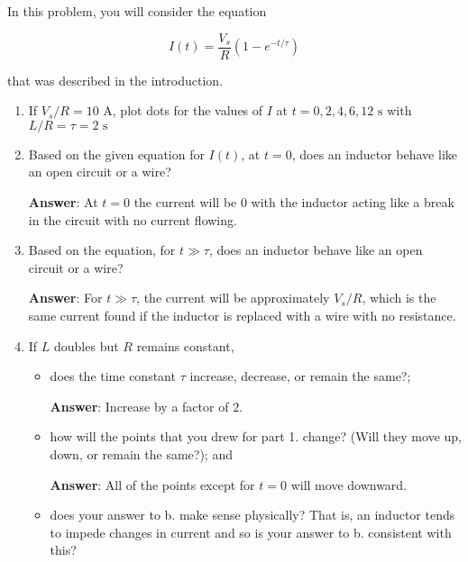 \documentclass{article}
\begin{document}
In this problem, you will consider the equation

$$I(t) = \frac{V_s}{R}\left(1-e^{-t/\tau}\right)$$

that was described in the introduction.

\begin{enumerate}

  \item If $V_s/R=10\text{ A}$, plot dots for the values of $I$ at $t=0, 2, 4, 6, 12\text{ s}$ with $L/R = \tau = 2\text{ s}$

        

  \item Based on the given equation for $I(t)$, at $t=0$, does an inductor behave like an open circuit or a wire?

        \ifsolutions
        \textbf{Answer}: At $t=0$ the current will be $0$ with the inductor acting like a break in the circuit with no current flowing.
        \else
        \vskip 24pt
        \fi

  \item Based on the equation, for $t\gg \tau$, does an inductor behave like an open circuit or a wire?

        \ifsolutions
        \textbf{Answer}: For $t \gg \tau$, the current will be approximately $V_s/R$, which is the same current found if the inductor is replaced with a wire with no resistance.
        \else
        \vskip 24pt
        \fi

  \item If $L$ doubles but $R$ remains constant,

    \begin{itemize}

      \item does the time constant $\tau$ increase, decrease, or remain the same?;

                \ifsolutions
                \textbf{Answer}: Increase by a factor of $2$.
                \else
                \vskip 24pt
                \fi

      \item how will the points that you drew for part 1. change? (Will they move up, down, or remain the same?); and

                \ifsolutions
                \textbf{Answer}: All of the points except for $t=0$ will move downward.
                \else
                \vskip 24pt
                \fi

      \item does your answer to b. make sense physically? That is, an inductor tends to impede changes in current and so is your answer to b. consistent with this?


\end{itemize}
\end{enumerate}
\end{document}
